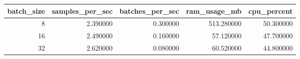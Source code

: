 \begin{tabular}{rrrrr}
\toprule
batch\_size & samples\_per\_sec & batches\_per\_sec & ram\_usage\_mb & cpu\_percent \\
\midrule
8 & 2.390000 & 0.300000 & 513.280000 & 50.300000 \\
16 & 2.490000 & 0.160000 & 57.120000 & 47.700000 \\
32 & 2.620000 & 0.080000 & 60.520000 & 44.800000 \\
\bottomrule
\end{tabular}

